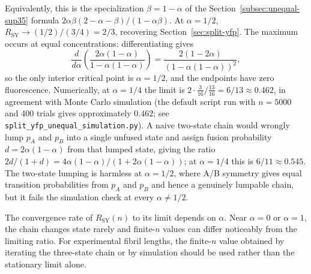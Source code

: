 \documentclass[referee,lineno,pdflatex,sn-mathphys-ay]{sn-jnl}
\begin{document}
Equivalently, this is the specialization $\beta = 1 - \alpha$ of the Section~\ref{subsec:unequal-sup35} formula $2\alpha\beta(2-\alpha-\beta)/(1-\alpha\beta)$. At $\alpha = 1/2$, $R_{\text{SY}} \to (1/2)/(3/4) = 2/3$, recovering Section~\ref{sec:split-yfp}. The maximum occurs at equal concentrations: differentiating gives
\[
\frac{d}{d\alpha}\left(\frac{2\alpha(1-\alpha)}{1-\alpha(1-\alpha)}\right)
= \frac{2(1-2\alpha)}{(1-\alpha(1-\alpha))^2},
\]
so the only interior critical point is $\alpha=1/2$, and the endpoints have zero fluorescence. Numerically, at $\alpha = 1/4$ the limit is $2 \cdot \tfrac{3}{16} / \tfrac{13}{16} = 6/13 \approx 0.462$, in agreement with Monte Carlo simulation (the default script run with $n=5000$ and 400 trials gives approximately $0.462$; see \texttt{split\_yfp\_unequal\_simulation.py}). A naive two-state chain would wrongly lump $p_A$ and $p_B$ into a single unfused state and assign fusion probability $d=2\alpha(1-\alpha)$ from that lumped state, giving the ratio $2d/(1+d)=4\alpha(1-\alpha)/(1+2\alpha(1-\alpha))$; at $\alpha = 1/4$ this is $6/11 \approx 0.545$. The two-state lumping is harmless at $\alpha=1/2$, where A/B symmetry gives equal transition probabilities from $p_A$ and $p_B$ and hence a genuinely lumpable chain, but it fails the simulation check at every $\alpha \neq 1/2$.

The convergence rate of $R_{\text{SY}}(n)$ to its limit depends on $\alpha$. Near $\alpha=0$ or $\alpha=1$, the chain changes state rarely and finite-$n$ values can differ noticeably from the limiting ratio. For experimental fibril lengths, the finite-$n$ value obtained by iterating the three-state chain or by simulation should be used rather than the stationary limit alone.
\end{document}
